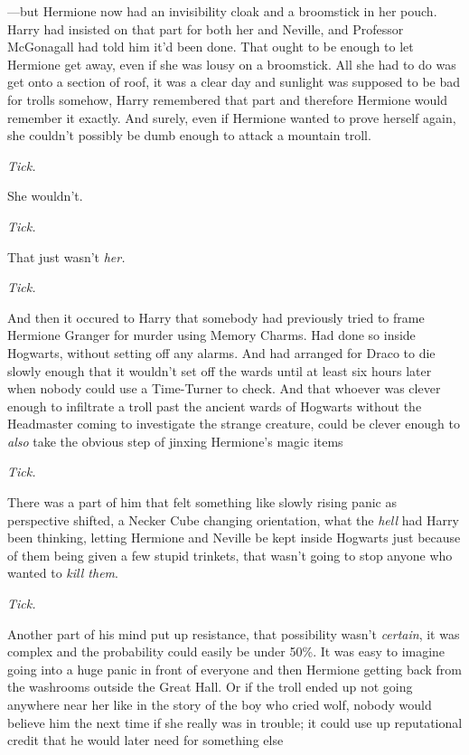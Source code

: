 —but Hermione now had an invisibility cloak and a broomstick in her pouch.
Harry had insisted on that part for both her and Neville, and Professor
McGonagall had told him it'd been done. That ought to be enough to let Hermione
get away, even if she was lousy on a broomstick. All she had to do was get onto
a section of roof, it was a clear day and sunlight was supposed to be bad for
trolls somehow, Harry remembered that part and therefore Hermione would
remember it exactly. And surely, even if Hermione wanted to prove herself
again, she couldn't possibly be dumb enough to attack a mountain troll.

\emph{Tick.}

She wouldn't.

\emph{Tick.}

That just wasn't \emph{her.}

\emph{Tick.}

And then it occured to Harry that somebody had previously tried to frame
Hermione Granger for murder using Memory Charms. Had done so inside Hogwarts,
without setting off any alarms. And had arranged for Draco to die slowly enough
that it wouldn't set off the wards until at least six hours later when nobody
could use a Time-Turner to check. And that whoever was clever enough to
infiltrate a troll past the ancient wards of Hogwarts without the Headmaster
coming to investigate the strange creature, could be clever enough to
\emph{also} take the obvious step of jinxing Hermione's magic items{\el}

\emph{Tick.}

There was a part of him that felt something like slowly rising panic as
perspective shifted, a Necker Cube changing orientation, what the \emph{hell}
had Harry been thinking, letting Hermione and Neville be kept inside Hogwarts
just because of them being given a few stupid trinkets, that wasn't going to
stop anyone who wanted to \emph{kill them}.

\emph{Tick.}

Another part of his mind put up resistance, that possibility wasn't
\emph{certain}, it was complex and the probability could easily be under 50\%.
It was easy to imagine going into a huge panic in front of everyone and then
Hermione getting back from the washrooms outside the Great Hall. Or if the
troll ended up not going anywhere near her{\el} like in the story of the boy
who cried wolf, nobody would believe him the next time if she really was in
trouble; it could use up reputational credit that he would later need for
something else{\el}

